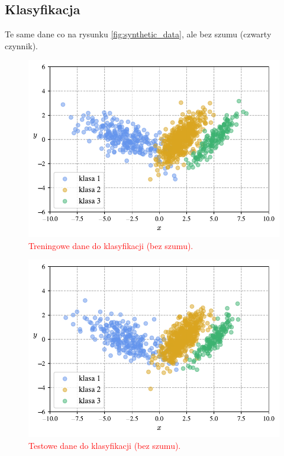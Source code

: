 \documentclass[12pt,a4paper,oneside]{book}
\theoremstyle{definition}
\begin{document}
\newpage
\subsection*{Klasyfikacja}

Te same dane co na rysunku \ref{fig:synthetic_data}, ale bez szumu (czwarty czynnik).

\begin{figure}[H]
    \centering
    \includegraphics[scale=0.7]{synthetic_train_data_classification}
    \vspace{-0.5cm} 
    \caption{\textcolor{red}{Treningowe dane do klasyfikacji (bez szumu).}}
    \label{fig:synthetic_train_data_classification}
\end{figure}

\begin{figure}[H]
    \centering
    \includegraphics[scale=0.7]{synthetic_test_data_classification}
    \vspace{-0.5cm} 
    \caption{\textcolor{red}{Testowe dane do klasyfikacji (bez szumu).}}
    \label{fig:synthetic_test_data_classification}
\end{figure}
\end{document}
